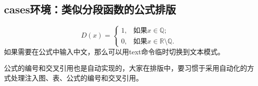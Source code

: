 \documentclass{ctexart}
\begin{document}
     \subsection{cases环境：类似分段函数的公式排版}
     \begin{equation}
        D(x) =
        \begin{cases}
           1,& \text{如果} x \in \mathbb{Q};\\
           0,& \text{如果} x \in
           \mathbb{R}\setminus \mathbb{Q}.
        \end{cases}
        \end{equation}
        如果需要在公式中输入中文，那么可以用text命令临时切换到文本模式。

        公式的编号和交叉引用也是自动实现的，大家在排版中，要习惯于采用自动化的方式处理注入图、表、公式的编号和交叉引用。
\end{document}
